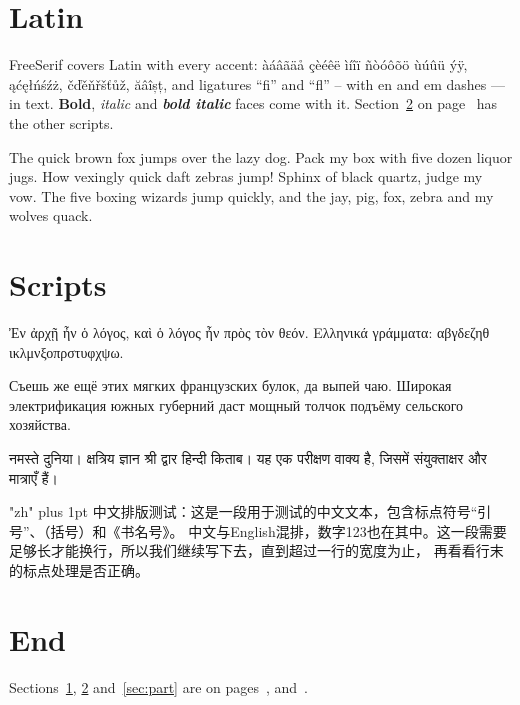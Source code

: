 \documentclass{article}
\newcommand\zhtext[1]{{\zh\XeTeXlinebreaklocale "zh"\XeTeXlinebreakskip=0pt plus 1pt #1}}
\begin{document}
\section{Latin}\label{sec:latin}
FreeSerif covers Latin with every accent: àáâãäå çèéêë ìíîï ñòóôõö ùúûü ýÿ, ąćęłńśźż,
čďěňřšťůž, ăâîșț, and ligatures ``fi'' and ``fl'' -- with en and em dashes --- in text.
\textbf{Bold}, \textit{italic} and \textbf{\textit{bold italic}} faces come with it.
Section~\ref{sec:scripts} on page~\pageref{sec:scripts} has the other scripts.

The quick brown fox jumps over the lazy dog. Pack my box with five dozen liquor jugs.
How vexingly quick daft zebras jump! Sphinx of black quartz, judge my vow. The five
boxing wizards jump quickly, and the jay, pig, fox, zebra and my wolves quack.

\section{Scripts}\label{sec:scripts}
{\greek Ἐν ἀρχῇ ἦν ὁ λόγος, καὶ ὁ λόγος ἦν πρὸς τὸν θεόν. Ελληνικά γράμματα: αβγδεζηθ
ικλμνξοπρστυφχψω.}

{\russian Съешь же ещё этих мягких французских булок, да выпей чаю. Широкая электрификация
южных губерний даст мощный толчок подъёму сельского хозяйства.}

{\deva नमस्ते दुनिया। क्षत्रिय ज्ञान श्री द्वार हिन्दी किताब। यह एक परीक्षण वाक्य है, जिसमें
संयुक्ताक्षर और मात्राएँ हैं।}

\zhtext{中文排版测试：这是一段用于测试的中文文本，包含标点符号“引号”、（括号）和《书名号》。
中文与English混排，数字123也在其中。这一段需要足够长才能换行，所以我们继续写下去，直到超过一行的宽度为止，
再看看行末的标点处理是否正确。}



\section{End}\label{sec:end}
Sections~\ref{sec:latin}, \ref{sec:scripts} and~\ref{sec:part} are on
pages~\pageref{sec:latin}, \pageref{sec:scripts} and~\pageref{sec:part}.
\end{document}
